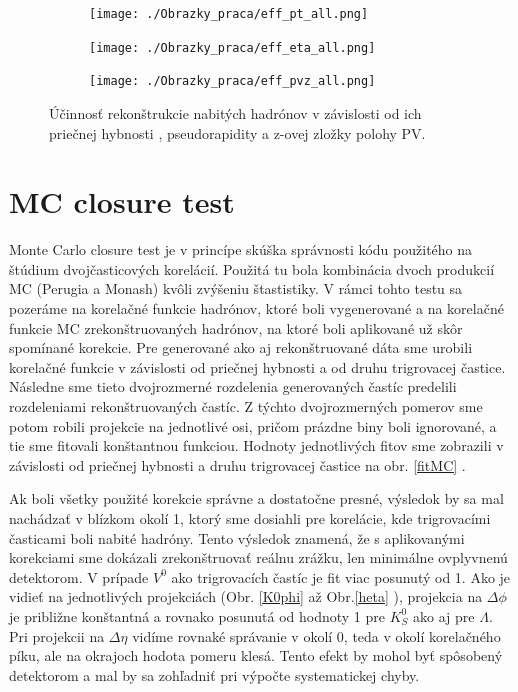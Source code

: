 \documentclass[thesismargins, thesislinespacing]{rnthesis}
\begin{document}
\begin{figure}[hbtp!]
	\centering
	\begin{subfigure}{0.33\textwidth}
		\centering
		\texttt{[image: ./Obrazky\_praca/eff\_pt\_all.png]}
		\caption{}
		\label{}
	\end{subfigure}%
	\begin{subfigure}{0.33\textwidth}
		\centering
		\texttt{[image: ./Obrazky\_praca/eff\_eta\_all.png]}
		\caption{}
		\label{}
	\end{subfigure}
	\begin{subfigure}{0.33\textwidth}
		\centering
		\texttt{[image: ./Obrazky\_praca/eff\_pvz\_all.png]}
		\caption{}
		\label{ucpvz}
	\end{subfigure}
	\caption{Účinnosť rekonštrukcie nabitých hadrónov v závislosti od ich priečnej hybnosti , pseudorapidity a z-ovej zložky polohy PV.}
	\label{uc}
\end{figure}

\section{MC closure test}

Monte Carlo closure test je v princípe skúška správnosti kódu použitého na štúdium dvojčasticových korelácií. Použitá tu bola kombinácia dvoch produkcií MC (Perugia a Monash) kvôli zvýšeniu štastistiky. V rámci tohto testu sa pozeráme na korelačné \-funk\-cie hadrónov, ktoré boli vygenerované a na korelačné funkcie MC zrekonštruovaných hadrónov, na ktoré boli aplikované už skôr spomínané korekcie. Pre generované ako aj rekonštruované dáta sme urobili korelačné funkcie v závislosti od priečnej hybnosti  a od druhu trigrovacej častice. Následne sme tieto dvojrozmerné rozdelenia generovaných častíc predelili rozdeleniami rekonštruovaných častíc. Z týchto dvojrozmerných pomerov sme potom robili projekcie na jednotlivé osi, pričom prázdne biny boli ignorované, a tie sme fitovali konštantnou funkciou. Hodnoty jednotlivých fitov sme zobrazili v závislosti od priečnej hybnosti a druhu trigrovacej častice na obr. \ref{fitMC} . 

Ak boli všetky použité korekcie správne a dostatočne presné, výsledok by sa mal nachádzať v blízkom okolí 1, ktorý sme dosiahli pre korelácie, kde trigrovacími časticami boli nabité hadróny. Tento výsledok znamená, že s aplikovanými korekciami sme dokázali zrekonštruovať reálnu zrážku, len minimálne ovplyvnenú detektorom.
V prípade $V^0$ ako trigrovacích častíc je fit viac posunutý od 1. Ako je vidieť na jednotlivých projekciách (Obr. \ref{K0phi}  až Obr.\ref{heta}  ), projekcia na $\Delta \phi$ je približne konštantná a rovnako posunutá od hodnoty 1 pre $K^0_S$ ako aj pre $\Lambda$. Pri projekcii na $\Delta \eta$ vidíme rovnaké správanie v okolí 0, teda v okolí korelačného píku, ale na okrajoch hodota pomeru klesá. Tento efekt by mohol byť spôsobený detektorom a mal by sa zohľadniť pri výpočte systematickej chyby. 
\end{document}
